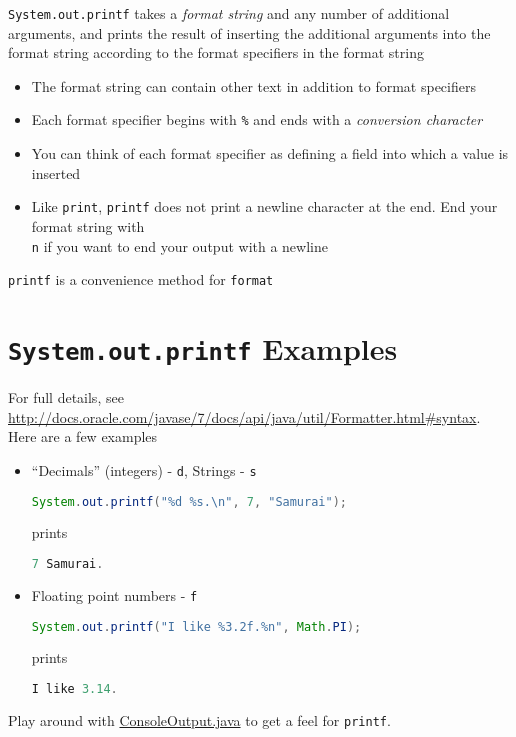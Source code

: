 \documentclass{article}
\begin{document}
{\tt System.out.printf} takes a {\it format string} and any number of additional arguments, and prints the result of inserting the additional arguments into the format string according to the format specifiers in the format string
\begin{itemize}
\item The format string can contain other text in addition to format specifiers
\item Each format specifier begins with {\tt \%} and ends with a {\it conversion character}
\item You can think of each format specifier as defining a field into which a value is inserted
\item Like {\tt print}, {\tt printf} does not print a newline character at the end.  End your format string with {\tt \\n} if you want to end your output with a newline
\end{itemize}
 {\tt printf} is a convenience method for {\tt format}

\section{{\tt System.out.printf} Examples}


For full details, see \url{http://docs.oracle.com/javase/7/docs/api/java/util/Formatter.html#syntax}.  Here are a few examples
\begin{itemize}

\item ``Decimals'' (integers) - {\tt d}, Strings - {\tt s}
\begin{lstlisting}[language=Java]
System.out.printf("%d %s.\n", 7, "Samurai");
\end{lstlisting}
prints
\begin{lstlisting}[language=Java]
7 Samurai.
\end{lstlisting}

\item Floating point numbers - {\tt f}
\begin{lstlisting}[language=Java]
 System.out.printf("I like %3.2f.%n", Math.PI);
\end{lstlisting}
prints
\begin{lstlisting}[language=Java]
I like 3.14.
\end{lstlisting}

\end{itemize}

Play around with \href{../code/ConsoleOutput.java}{ConsoleOutput.java} to get a feel for {\tt printf}.
\end{document}
